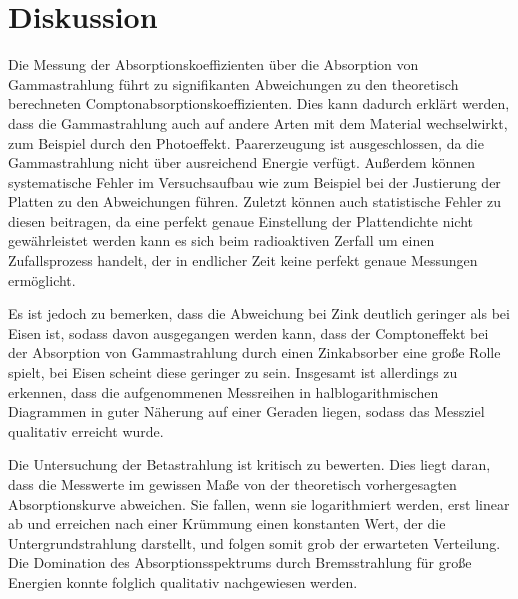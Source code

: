 \section{Diskussion}
\label{sec:Diskussion}
Die Messung der Absorptionskoeffizienten über die Absorption von Gammastrahlung führt
zu signifikanten Abweichungen zu den theoretisch berechneten Comptonabsorptionskoeffizienten.
Dies kann dadurch erklärt werden, dass die Gammastrahlung auch auf andere Arten mit dem Material
wechselwirkt, zum Beispiel durch den Photoeffekt. Paarerzeugung ist ausgeschlossen,
da die Gammastrahlung nicht über ausreichend Energie verfügt. Außerdem können systematische
Fehler im Versuchsaufbau wie zum Beispiel bei der Justierung der Platten zu den Abweichungen führen.
Zuletzt können auch statistische Fehler zu diesen beitragen, da eine perfekt genaue Einstellung
der Plattendichte nicht gewährleistet werden kann es sich beim radioaktiven Zerfall um einen
Zufallsprozess handelt, der in endlicher Zeit keine perfekt genaue Messungen ermöglicht.

Es ist jedoch zu bemerken, dass die Abweichung bei Zink deutlich geringer als bei Eisen ist, sodass
davon ausgegangen werden kann, dass der Comptoneffekt bei der Absorption von Gammastrahlung
durch einen Zinkabsorber eine große Rolle spielt, bei Eisen scheint diese geringer zu sein.
Insgesamt ist allerdings zu erkennen, dass die aufgenommenen Messreihen in halblogarithmischen Diagrammen
in guter Näherung auf einer Geraden liegen, sodass das Messziel qualitativ erreicht wurde.

Die Untersuchung der Betastrahlung ist kritisch zu bewerten. Dies liegt daran, dass die Messwerte im gewissen Maße
von der theoretisch vorhergesagten Absorptionskurve abweichen. Sie fallen, wenn sie logarithmiert werden,
erst linear ab und erreichen nach einer Krümmung einen konstanten Wert, der die Untergrundstrahlung darstellt, und
folgen somit grob der erwarteten Verteilung. Die Domination des Absorptionsspektrums durch Bremsstrahlung
für große Energien konnte folglich qualitativ nachgewiesen werden.

